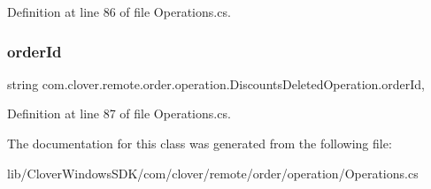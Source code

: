 Definition at line 86 of file Operations.\+cs.

\mbox{\label{classcom_1_1clover_1_1remote_1_1order_1_1operation_1_1_discounts_deleted_operation_a0a18d8ad82ea9ac7aa64f5338bb624d8}} 
\subsubsection{\texorpdfstring{order\+Id}{orderId}}
{\footnotesize\ttfamily string com.\+clover.\+remote.\+order.\+operation.\+Discounts\+Deleted\+Operation.\+order\+Id\hspace{0.3cm}{\ttfamily [get]}, {\ttfamily [set]}}



Definition at line 87 of file Operations.\+cs.



The documentation for this class was generated from the following file\+:\begin{DoxyCompactItemize}
\item 
lib/\+Clover\+Windows\+S\+D\+K/com/clover/remote/order/operation/Operations.\+cs\end{DoxyCompactItemize}
